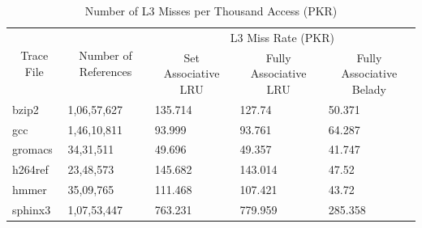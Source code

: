 \documentclass[]{article}
\begin{document}
\begin{table}[h]
\begin{tabular}{|l|l|l|l|l|}
\hline
\multicolumn{1}{|c|}{\multirow{2}{*}{Trace   File}} &
  \multicolumn{1}{c|}{\multirow{2}{*}{Number of References}} &
  \multicolumn{3}{c|}{L3 Miss Rate (PKR)} \\ \cline{3-5} 
\multicolumn{1}{|c|}{} &
  \multicolumn{1}{c|}{} &
  \multicolumn{1}{c|}{Set   Associative LRU} &
  \multicolumn{1}{c|}{Fully Associative LRU} &
  \multicolumn{1}{c|}{Fully Associative Belady} \\ \hline
bzip2   & 1,06,57,627 & 135.714 & 127.74  & 50.371  \\
gcc     & 1,46,10,811 & 93.999  & 93.761  & 64.287  \\
gromacs & 34,31,511   & 49.696  & 49.357  & 41.747  \\
h264ref & 23,48,573   & 145.682 & 143.014 & 47.52   \\
hmmer   & 35,09,765   & 111.468 & 107.421 & 43.72   \\
sphinx3 & 1,07,53,447 & 763.231 & 779.959 & 285.358 \\
\hline
\end{tabular}
\caption{Number of L3 Misses per Thousand Access (PKR)}
\end{table}
\end{document}

